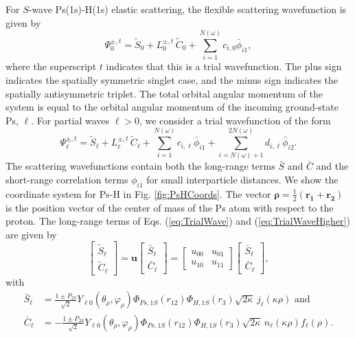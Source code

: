 \documentclass[preprint,showpacs,showkeys,preprintnumbers,amsmath,amssymb,longbibliography,pra,aps]{revtex4-1}
\begin{document}
For $S$-wave Ps(1s)-H(1s) elastic scattering, the flexible scattering
wavefunction is given by
\begin{equation}
\Psi_0^{\pm,t} = \widetilde{S}_0 + L_0^{\pm,t} \, \widetilde{C}_0
  + \sum_{i=1}^{N(\omega)} c_{i,0} \bar{\phi}_{i1},
\label{eq:TrialWave}
\end{equation}
where the superscript $t$ indicates that this is a trial wavefunction. The plus
sign indicates the spatially symmetric singlet case, and the minus sign
indicates the spatially antisymmetric triplet. The total orbital angular
momentum of the system is equal to the orbital angular momentum of the incoming
ground-state Ps, $\ell$. For partial waves $\ell > 0$, we consider a trial
wavefunction of the form
\begin{equation}
\Psi_\ell^{\pm,t} = \widetilde{S}_\ell + L^{\pm,t}_\ell \, \widetilde{C}_\ell
 + \sum_{i=1}^{N(\omega)} c_{i,\ell} \bar{\phi}_{i1}
 + \!\!\!\sum_{i=N(\omega)+1}^{2N(\omega)} \!\! d_{i,\ell} \bar{\phi}_{i2}.
\label{eq:TrialWaveHigher}
\end{equation}
The scattering wavefunctions contain both the long-range terms $\bar{S}$ and
$\bar{C}$ and the short-range correlation terms $\phi_{i1}$ for small
interparticle distances. We show the coordinate system for Ps-H in 
Fig. \ref{fig:PsHCoords}. The vector
$\bm{\rho} = \frac{1}{2}\left(\bm{r_1} + \bm{r_2}\right)$ is the position
vector of the center of mass of the Ps atom with respect to the proton. The 
long-range terms of Eqs. (\ref{eq:TrialWave}) and (\ref{eq:TrialWaveHigher})
are given by
\begin{equation}
\label{eq:SCPhiDef}
\begin{bmatrix}
\widetilde{S}_\ell \\ \widetilde{C}_\ell
\end{bmatrix} = \textbf{u}  \begin{bmatrix}
\bar{S}_\ell \\ \bar{C}_\ell
\end{bmatrix} = \begin{bmatrix}
u_{00} & u_{01} \\  u_{10} & u_{11}
\end{bmatrix}
\begin{bmatrix}
\bar{S}_\ell \\ \bar{C}_\ell
\end{bmatrix}, 
\end{equation}
with
\begin{subequations}
\label{eq:SCBarPhiDef}
\begin{align}
\bar{S}_\ell &= \frac{1\pm P_{23}}{\sqrt{2}}Y_{\ell 0}(\theta_\rho,
  \varphi_\rho)\Phi_{Ps,1S}\left(r_{12}\right) \Phi_{H,1S}\left(r_3\right)
  \sqrt{2\kappa} \,j_\ell\left(\kappa\rho\right) \text{ and} \label{eq:SBar} \\
\bar{C}_\ell &= -\frac{1\pm P_{23}}{\sqrt{2}}Y_{\ell 0}(\theta_\rho,
  \varphi_\rho)\Phi_{Ps,1S}\left(r_{12}\right) \Phi_{H,1S}\left(r_3\right)
  \sqrt{2\kappa} \,n_\ell\left(\kappa\rho\right) f_\ell(\rho). \label{eq:CBar}
\end{align}
\end{subequations}
\end{document}
